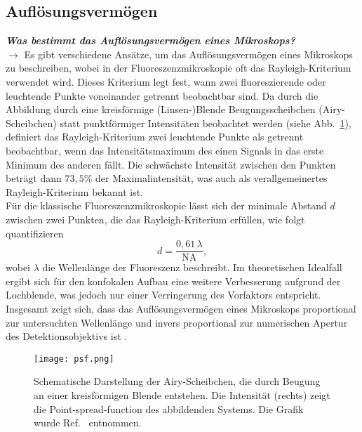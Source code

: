 \subsection{\label{subsec:FZV7}Auflösungsvermögen}
\textbf{\textit{Was bestimmt das Auflösungsvermögen eines Mikroskops?}} \\
$\rightarrow$
Es gibt verschiedene Ansätze, um das Auflösungsvermögen eines Mikroskops zu beschreiben,
wobei in der Fluoreszenzmikroskopie oft das Rayleigh-Kriterium verwendet wird.
Dieses Kriterium legt fest, wann zwei fluoreszierende oder leuchtende Punkte voneinander
getrennt beobachtbar sind. Da durch die Abbildung durch eine kreisförmige (Linsen-)Blende
Beugungsscheibchen (Airy-Scheibchen) statt punktförmiger Intensitäten beobachtet werden (siehe Abb.~\ref{fig:airy}),
definiert das Rayleigh-Kriterium zwei leuchtende Punkte als getrennt beobachtbar,
wenn das Intensitätsmaximum des einen Signals in das erste Minimum des anderen fällt.
Die schwächste Intensität zwischen den Punkten beträgt dann $73,5\%$ der Maximalintensität,
was auch als verallgemeinertes Rayleigh-Kriterium bekannt ist. \\
Für die klassische Fluoreszenzmikroskopie lässt sich der minimale Abstand $d$ zwischen zwei Punkten,
die das Rayleigh-Kriterium erfüllen, wie folgt quantifizieren
\begin{equation}\label{eq:aufl}
  d = \frac{0,61\,\lambda}{\text{NA}},
\end{equation}
wobei $\lambda$ die Wellenlänge der Fluoreszenz beschreibt.
Im theoretischen Idealfall ergibt sich für den konfokalen Aufbau eine weitere
Verbesserung aufgrund der Lochblende, was jedoch nur einer Verringerung des Vorfaktors entspricht. \\
Insgesamt zeigt sich, dass das Auflösungsvermögen eines Mikroskops proportional zur untersuchten
Wellenlänge und invers proportional zur numerischen Apertur des Detektionsobjektivs ist \cite{Auf1, Auf2, Auf3}.
\begin{figure}[h!]
  \centering
  \texttt{[image: psf.png]}
  \caption{\label{fig:airy}Schematische Darstellung der Airy-Scheibchen, die durch
    Beugung an einer kreisförmigen Blende entstehen. Die Intensität (rechts) zeigt die
    Point-spread-function des abbildenden Systems. Die Grafik wurde Ref.~\cite{psf} entnommen.}
\end{figure} \FloatBarrier